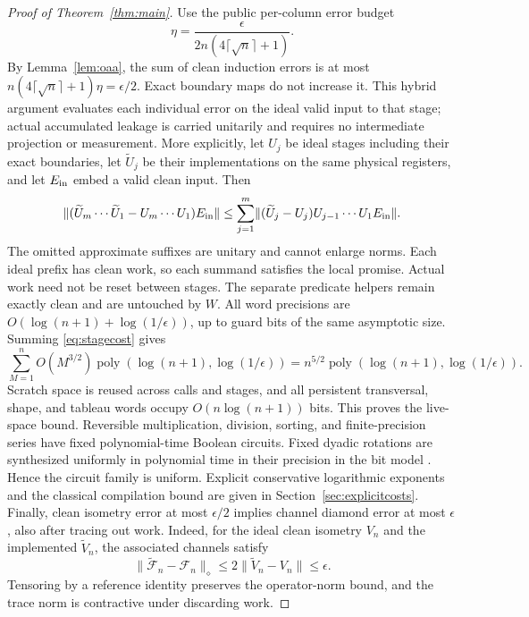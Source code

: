 \documentclass[11pt]{article}
\theoremstyle{definition}
\newcommand{\norm}[1]{\lVert #1\rVert}
\newcommand{\poly}{\operatorname{poly}}
\begin{document}
\begin{proof}[Proof of Theorem~\ref{thm:main}]
Use the public per-column error budget
\begin{equation}\label{eq:budget}
 \eta=\frac{\epsilon}{2n(4\lceil\sqrt n\rceil+1)}.
\end{equation}
By Lemma~\ref{lem:oaa}, the sum of clean induction errors is at most
$n(4\lceil\sqrt n\rceil+1)\eta=\epsilon/2$. Exact boundary maps do not
increase it. This hybrid argument evaluates each individual error on the
ideal valid input to that stage; actual accumulated leakage is carried
unitarily and requires no intermediate projection or measurement.
More explicitly, let $U_j$ be ideal stages including their exact
boundaries, let $\widetilde U_j$ be their implementations on the same
physical registers, and let $E_{\rm in}$ embed a valid clean input. Then
\begin{equation}\label{eq:hybrid}
\norm{(\widetilde U_m\cdots\widetilde U_1-U_m\cdots U_1)E_{\rm in}}
\le
\sum_{j=1}^m
\norm{(\widetilde U_j-U_j)U_{j-1}\cdots U_1E_{\rm in}}.
\end{equation}
The omitted approximate suffixes are unitary and cannot enlarge norms.
Each ideal prefix has clean work, so each summand satisfies the local
promise. Actual work need not be reset between stages. The separate
predicate helpers remain exactly clean and are untouched by $W$.
All word precisions are $O(\log(n+1)+\log(1/\epsilon))$, up to guard
bits of the same asymptotic size. Summing \eqref{eq:stagecost} gives
\[
 \sum_{M=1}^n O(M^{3/2})\poly(\log(n+1),\log(1/\epsilon))
 =n^{5/2}\poly(\log(n+1),\log(1/\epsilon)).
\]
Scratch space is reused across calls and stages, and all persistent
transversal, shape, and tableau words occupy $O(n\log(n+1))$ bits.
This proves the live-space bound. Reversible multiplication, division,
sorting, and finite-precision series have fixed polynomial-time Boolean
circuits. Fixed dyadic rotations are synthesized uniformly in polynomial
time in their precision in the bit model \cite{mw}. Hence the circuit
family is uniform. Explicit conservative logarithmic exponents and the
classical compilation bound are given in Section~\ref{sec:explicitcosts}.
Finally, clean isometry error at most $\epsilon/2$ implies channel
diamond error at most $\epsilon$, also after tracing out work.
Indeed, for the ideal clean isometry $V_n$ and the implemented
$\widetilde V_n$, the associated channels satisfy
\[
 \norm{\widetilde{\mathcal F}_n-\mathcal F_n}_\diamond
 \le 2\norm{\widetilde V_n-V_n}\le\epsilon.
\]
Tensoring by a reference identity preserves the operator-norm bound,
and the trace norm is contractive under discarding work.
\end{proof}
\end{document}
